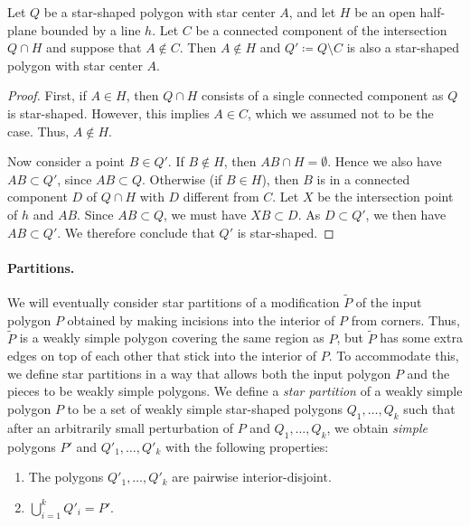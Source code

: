\documentclass{theoretics}
\begin{document}
\begin{lemma}\label{lemma:cut}
Let $Q$ be a star-shaped polygon with star center $A$, and let $H$ be an open half-plane bounded by a line $h$.
Let $C$ be a connected component of the intersection $Q\cap H$ and suppose that $A\notin C$.
Then $A\notin H$ and $Q' \coloneqq Q\setminus C$ is also a star-shaped polygon with star center $A$.
\end{lemma}

\begin{proof}
First, if $A \in H$, then $Q\cap H$ consists of a single connected component as $Q$ is star-shaped. However, this implies $A \in C$, which we assumed not to be the case. Thus, $A \notin H$.

Now consider a point $B\in Q'$.
If $B\notin H$, then $AB\cap H=\emptyset$. Hence we also have $AB\subset Q'$, since $AB\subset Q$.
Otherwise (if $B \in H$), then $B$ is in a connected component $D$ of $Q\cap H$ with $D$ different from $C$.
Let $X$ be the intersection point of $h$ and $AB$.
Since $AB\subset Q$, we must have $XB\subset D$.
As $D\subset Q'$, we then have $AB\subset Q'$.
We therefore conclude that $Q'$ is star-shaped.
\end{proof}

\paragraph{Partitions.}
We will eventually consider star partitions of a modification $\tilde P$ of the input polygon $P$ obtained by making incisions into the interior of $P$ from corners.
Thus, $\tilde P$ is a weakly simple polygon covering the same region as $P$, but $\tilde P$ has some extra edges on top of each other that stick into the interior of $P$.
To accommodate this, we define star partitions in a way that allows both the input polygon $P$ and the pieces to be weakly simple polygons.
We define a \emph{star partition} of a weakly simple polygon $P$ to be a set of weakly simple star-shaped polygons $Q_1,\ldots,Q_k$ such that after an arbitrarily small perturbation of $P$ and $Q_1, \dots, Q_k$, we obtain \emph{simple} polygons $P'$ and $Q'_1,\ldots,Q'_k$ with the following properties:

\begin{enumerate}
    \item The polygons $Q'_1,\ldots,Q'_k$ are pairwise interior-disjoint. \label{partprop:1}
    
    \item $\bigcup_{i=1}^k Q'_i =P'$. \label{partprop:2}
\end{enumerate}
\end{document}
